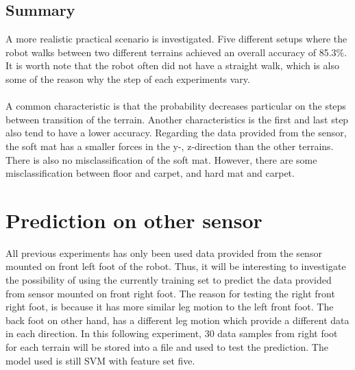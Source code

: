 \documentclass[USenglish]{ifimaster}  %
\begin{document}
\subsection{Summary}
A more realistic practical scenario is investigated. Five different setups where the robot walks between two different terrains achieved an overall accuracy of 85.3\%. It is worth note that the robot often did not have a straight walk, which is also some of the reason why the step of each experiments vary. 
\\
\\
A common characteristic is that the probability decreases particular on the steps between transition of the terrain. Another characteristics is the first and last step also tend to have a lower accuracy. Regarding the data provided from the sensor, the soft mat has a smaller forces in the y-, z-direction than the other terrains. There is also no misclassification of the soft mat. However, there are some misclassification between floor and carpet, and hard mat and carpet.
  	
\newpage
\section{Prediction on other sensor}
All previous experiments has only been used data provided from the sensor mounted on front left foot of the robot. Thus, it will be interesting to investigate the possibility of using the currently training set to predict the data provided from sensor mounted on front right foot. The reason for testing the right front right foot, is because it has more similar leg motion to the left front foot. The back foot on other hand, has a different leg motion which provide a different data in each direction. In this following experiment, 30 data samples from right foot for each terrain will be stored into a file and used to test the prediction. The model used is still SVM with feature set five.

	
\end{document}
